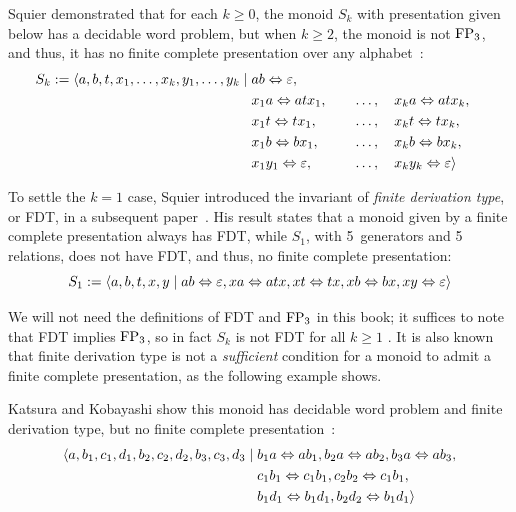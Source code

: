 \documentclass[../generics]{subfiles}
\begin{document}
\begin{example}
Squier demonstrated that for each $k \geq 0$, the monoid $S_k$ with presentation given below has a decidable word problem, but when $k \geq 2$, the monoid is not $\mathrm{FP}_3$, and thus, it has no finite complete presentation over any alphabet~\cite{fptype}:
\begin{alignat*}{2}
S_k := \langle a,b,t,x_1,\ldots,x_k,y_1,\ldots,y_k \mid 
{}&ab \Leftrightarrow \varepsilon, \\
&x_1 a \Leftrightarrow a t x_1, && \quad \ldots,\quad  x_k a \Leftrightarrow a t x_k, \\
&x_1 t \Leftrightarrow t x_1, && \quad \ldots,\quad x_k t \Leftrightarrow t x_k, \\
&x_1 b \Leftrightarrow b x_1, && \quad \ldots,\quad x_k b \Leftrightarrow b x_k, \\
&x_1 y_1 \Leftrightarrow \varepsilon, && \quad \ldots,\quad x_k y_k \Leftrightarrow \varepsilon\rangle
\end{alignat*}
\end{example}

\begin{example}
To settle the $k=1$ case, Squier introduced the invariant of \emph{finite derivation type}, or FDT, in a subsequent paper~\cite{SQUIER1994271}. His result states that a monoid given by a finite complete presentation always has FDT, while $S_1$, with 5~generators and 5 relations, does not have FDT, and thus, no finite complete presentation:
\[S_1:=\langle a,b,t,x,y \mid ab\Leftrightarrow \varepsilon,xa\Leftrightarrow atx,xt\Leftrightarrow tx,xb\Leftrightarrow bx,xy\Leftrightarrow \varepsilon\rangle\]
\end{example}

We will not need the definitions of FDT and $\mathrm{FP}_3$ in this book; it suffices to note that FDT implies $\mathrm{FP}_3$, so in fact $S_k$ is not FDT for all $k \geq 1$ \cite{fdtfp3}. It is also known that finite derivation type is not a \emph{sufficient} condition for a monoid to admit a finite complete presentation, as the following example shows.

\begin{example}
Katsura and Kobayashi show this monoid has decidable word problem and finite derivation type, but no finite complete presentation~\cite{solid}:
\begin{align*}
\langle a,b_1,c_1,d_1,b_2,c_2,d_2,b_3,c_3,d_3 \mid {}&b_1 a \Leftrightarrow ab_1,
b_2 a \Leftrightarrow ab_2,
b_3 a \Leftrightarrow ab_3,\\
&c_1 b_1 \Leftrightarrow c_1 b_1,c_2 b_2 \Leftrightarrow c_1 b_1,\\
&b_1 d_1 \Leftrightarrow b_1 d_1,b_2 d_2 \Leftrightarrow b_1 d_1\rangle
\end{align*}
\end{example}
\end{document}
